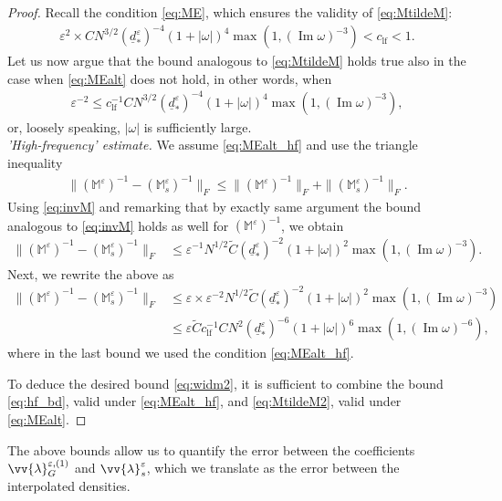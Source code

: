 \documentclass[]{article}
\numberwithin{equation}{section}
\numberwithin{theorem}{section}
\numberwithin{lemma}{section}
\numberwithin{corollary}{section}
\numberwithin{proposition}{section}
\numberwithin{definition}{section}
\newcommand{\mypar}[1]{\noindent\textit{#1}\hspace{0.1em}}
\newcommand{\re}{\varepsilon}
\renewcommand{\Im}{\operatorname{Im}}
\begin{document}
\begin{proof}
		Recall the condition  \eqref{eq:ME}, which ensures the validity of \eqref{eq:MtildeM}:
		\begin{align}
			\label{eq:MEalt}
			\re^2 \times CN^{3/2} (\underline{d}^{\re}_{*})^{-4} (1+|\omega|)^4 \max(1, (\Im \omega)^{-3})<c_{\operatorname{lf}}<1.
		\end{align}
		Let us now argue that the bound analogous to \eqref{eq:MtildeM} holds true also in the case when \eqref{eq:MEalt} does not hold, in other words, when 
		\begin{align}
			\label{eq:MEalt_hf}
			\re^{-2}\leq c^{-1}_{\operatorname{lf}}CN^{3/2}(\underline{d}^{\re}_{*})^{-4} (1+|\omega|)^4 \max(1, (\Im \omega)^{-3}),
		\end{align} 
		or, loosely speaking, $|\omega|$ is sufficiently large. \\	
		\mypar{'High-frequency' estimate. }
		We assume \eqref{eq:MEalt_hf} and use the triangle inequality
		\begin{align*}%
			\|(\mathbb{M}^{\re})^{-1}-\left(\mathbb{M}^{\re}_s \right)^{-1}\|_F \leq
			\|(\mathbb{M}^{\re})^{-1}\|_F+\|(\mathbb{M}^{\re}_s )^{-1}\|_F.
		\end{align*}
		Using \eqref{eq:invM} and remarking that by exactly same argument the bound analogous to \eqref{eq:invM} holds as well for $\left(\mathbb{{M}}^{\re}\right)^{-1}$, we obtain 
		\begin{align*}%
			\|(\mathbb{M}^{\re})^{-1}-\left(\mathbb{M}^{\re}_s \right)^{-1}\|_F&\leq \re^{-1} N^{1/2}\widetilde{C} (\underline{d}^{\re}_{*})^{-2} (1+|\omega|)^2 \max(1, (\Im \omega)^{-3}). 
		\end{align*}
		Next, we rewrite the above as 
		\begin{align}
			\nonumber
			\|(\mathbb{M}^{\re})^{-1}-\left(\mathbb{M}^{\re}_s \right)^{-1}\|_F&\leq \re \times \re^{-2}N^{1/2} \widetilde{C} (\underline{d}^{\re}_{*})^{-2} (1+|\omega|)^2 \max(1, (\Im \omega)^{-3}) \\
			\label{eq:hf_bd}
			&\leq \re  \widetilde{C}c^{-1}_{\operatorname{lf}}CN^{2}(\underline{d}^{\re}_{*})^{-6} (1+|\omega|)^6 \max(1, (\Im \omega)^{-6}),
		\end{align}
		where in the last bound we used the condition \eqref{eq:MEalt_hf}. 
		
		To deduce the desired bound \eqref{eq:widm2}, it is sufficient to combine the bound \eqref{eq:hf_bd}, valid under \eqref{eq:MEalt_hf}, and \eqref{eq:MtildeM2}, valid under \eqref{eq:MEalt}.   
	\end{proof}
	The above bounds allow us to quantify the error between the coefficients $ \vv{\lambda}^{\re, (1)}_G$ and $\vv{\lambda}^{\re}_s$, which we translate as the error between the interpolated densities.
\end{document}
